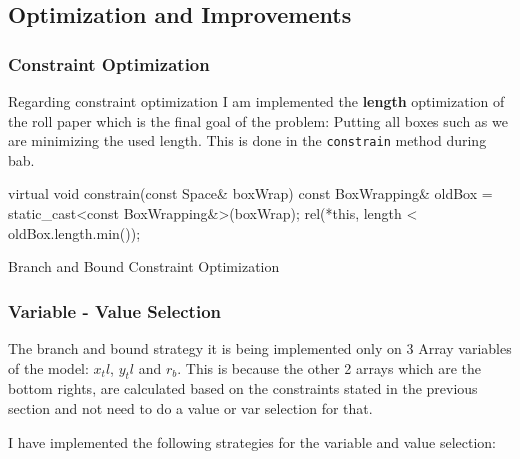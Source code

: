 \documentclass[12pt, a4paper]{article}
\begin{document}
\subsection{Optimization and Improvements}
\subsubsection{Constraint Optimization}
Regarding constraint optimization I am implemented the \textbf{length} optimization of the roll paper which is the final goal of the problem: Putting all boxes such as we are minimizing the used length. This is done in the \texttt{constrain} method during \acrfull{bab}.

\begin{listing}[H]
\begin{cppcode*}{}
  virtual void constrain(const Space& boxWrap){
    const BoxWrapping& oldBox = static_cast<const BoxWrapping&>(boxWrap);
    rel(*this, length < oldBox.length.min());
  }
\end{cppcode*}
\caption{Branch and Bound Constraint Optimization}
\label{lst:constrain}
\end{listing}



\subsubsection{Variable - Value Selection}
The branch and bound strategy it is being implemented only on 3 Array variables of the model: $x_tl$, $y_tl$ and $r_b$. This is because the other 2 arrays which are the bottom rights, are calculated based on the constraints stated in the previous section and not need to do a value or var selection for that.

I have implemented the following strategies for the variable and value selection:
\end{document}
